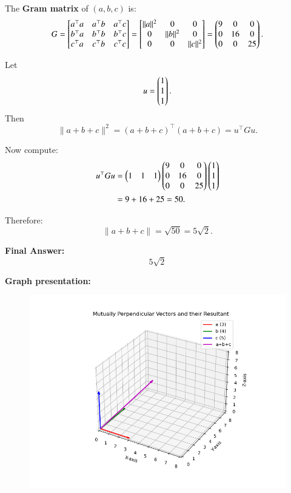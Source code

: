 \documentclass[journal]{IEEEtran}
\begin{document}
\bigskip

The \textbf{Gram matrix} of \( (a, b, c) \) is:
\begin{equation} \label{eq10}
G =
\begin{bmatrix}
a^\top a & a^\top b & a^\top c \\
b^\top a & b^\top b & b^\top c \\
c^\top a & c^\top b & c^\top c
\end{bmatrix}
=
\begin{bmatrix}
\|a\|^2 & 0 & 0 \\
0 & \|b\|^2 & 0 \\
0 & 0 & \|c\|^2
\end{bmatrix}
=
\begin{pmatrix}
9 & 0 & 0 \\
0 & 16 & 0 \\
0 & 0 & 25
\end{pmatrix}.
\end{equation}

Let
\[
u = \begin{pmatrix}1 \\ 1 \\ 1\end{pmatrix}.
\]
Then
\begin{equation} \label{eq11}
\|a + b + c\|^2 = (a + b + c)^\top (a + b + c) = u^\top G u.
\end{equation}

Now compute:
\begin{align}
u^\top G u 
&= \begin{pmatrix}1 & 1 & 1\end{pmatrix}
\begin{pmatrix}
9 & 0 & 0 \\
0 & 16 & 0 \\
0 & 0 & 25
\end{pmatrix}
\begin{pmatrix}1 \\ 1 \\ 1\end{pmatrix} \nonumber \\
&= 9 + 16 + 25 = 50. \label{eq12}
\end{align}

Therefore:
\begin{equation} \label{eq13}
\|a + b + c\| = \sqrt{50} = 5\sqrt{2}.
\end{equation}

\bigskip

\textbf{Final Answer:}
\[
\boxed{5\sqrt{2}}
\]

\textbf{Graph presentation:}
\begin{figure}[H]
\begin{center}
\includegraphics[width=0.6\columnwidth]{figs/fig4.png}
\end{center}
\caption{}
\label{fig:Fig}
\end{figure}    
\end{document}
